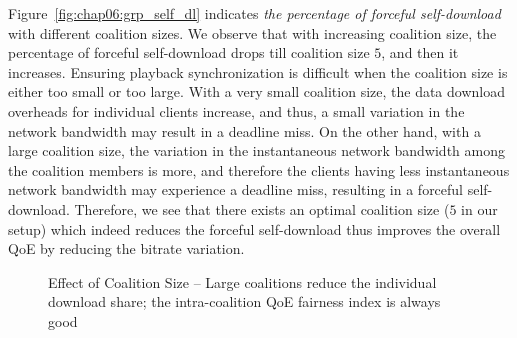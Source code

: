 Figure~\ref{fig:chap06:grp_self_dl} indicates \textit{the percentage of forceful self-download} with different coalition sizes. We observe that with increasing coalition size, the percentage of forceful self-download drops till coalition size $5$, and then it increases. Ensuring playback synchronization is difficult when the coalition size is either too small or too large. With a very small coalition size, the data download overheads for individual clients increase, and thus, a small variation in the network bandwidth may result in a deadline miss. On the other hand, with a large coalition size, the variation in the instantaneous network bandwidth among the coalition members is more, and therefore the clients having less instantaneous network bandwidth may experience a deadline miss, resulting in a forceful self-download. Therefore, we see that there exists an optimal coalition size ($5$ in our setup) which indeed reduces the forceful self-download thus improves the overall QoE by reducing the bitrate variation.    


\begin{figure}[!ht]
	\captionsetup[subfigure]{width=0.49\linewidth}
	\begin{center}
	\end{center}
	\caption{\label{fig:chap06:grp_contri_n_force}Effect of Coalition Size -- Large coalitions reduce the individual download share; the intra-coalition QoE fairness index is always good}
\end{figure}

